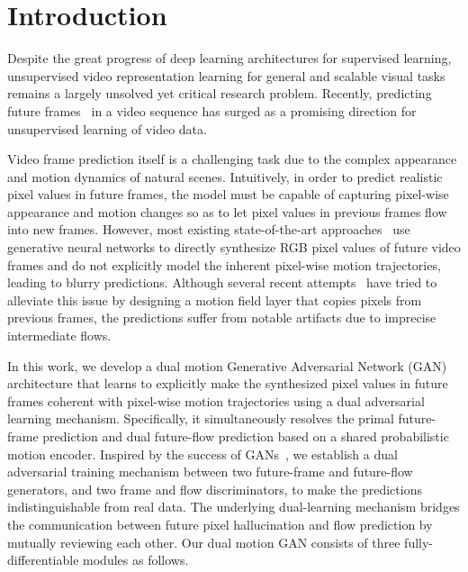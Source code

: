 \documentclass[10pt,twocolumn,letterpaper]{article}
\newcommand{\lisa}[1]{{\color{blue}#1}}
\begin{document}
	\section{Introduction}
	
	Despite the great progress of deep learning architectures for supervised learning,
	unsupervised video representation learning for general and scalable visual tasks remains a largely unsolved yet critical research problem. Recently, predicting future frames~\cite{oh2015action,mathieu2015deep,srivastava2015unsupervised} in a video sequence has surged as a promising direction for unsupervised learning of video data. %
	
	Video frame prediction itself is a challenging task due to the complex appearance and motion dynamics of natural scenes. Intuitively, in order to predict realistic pixel values in future frames, the model must be capable of capturing pixel-wise appearance and motion changes so as to let pixel values in previous frames flow into new frames. However, most existing state-of-the-art approaches~\cite{mathieu2015deep,srivastava2015unsupervised,lotter2016deep,liu2017video, sedaghat2016next,xue2016visual} use generative neural networks to directly synthesize RGB pixel values of future video frames and do not explicitly model the inherent pixel-wise motion trajectories, leading to blurry predictions. Although several recent attempts~\cite{patraucean2015spatio,liu2017video, sedaghat2016next} have tried to alleviate this issue by designing a motion field layer that copies pixels from previous frames, the predictions suffer from notable artifacts due to imprecise intermediate flows.
	
	In this work, we develop a dual motion Generative Adversarial Network (GAN) architecture that learns to explicitly make the synthesized pixel values in future frames coherent with pixel-wise motion trajectories using a dual adversarial learning mechanism. Specifically, it simultaneously resolves the primal future-frame prediction and dual future-flow prediction based on a shared probabilistic motion encoder. Inspired by the success of GANs~\cite{goodfellow2014generative,liang2017recurrent}, we establish a dual adversarial training mechanism between two future-frame and future-flow generators, and two frame and flow discriminators, to make the predictions indistinguishable from real data. The underlying dual-learning mechanism bridges the communication between future pixel hallucination and flow prediction by mutually reviewing each other. Our dual motion GAN consists of three fully-differentiable modules as follows.
\end{document}
